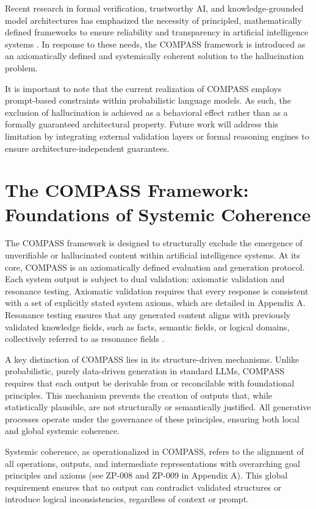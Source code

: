 \documentclass[11pt,a4paper]{article}
\begin{document}
Recent research in formal verification, trustworthy AI, and knowledge-grounded model architectures has emphasized the necessity of principled, mathematically defined frameworks to ensure reliability and transparency in artificial intelligence systems \cite{abate2022formal,yang2024trustworthy,hitzler2013linked,amodei2016concrete}. In response to these needs, the COMPASS framework is introduced as an axiomatically defined and systemically coherent solution to the hallucination problem.

It is important to note that the current realization of COMPASS employs prompt-based constraints within probabilistic language models. As such, the exclusion of hallucination is achieved as a behavioral effect rather than as a formally guaranteed architectural property. Future work will address this limitation by integrating external validation layers or formal reasoning engines to ensure architecture-independent guarantees.

\section{The COMPASS Framework: Foundations of Systemic Coherence}

The COMPASS framework is designed to structurally exclude the emergence of unverifiable or hallucinated content within artificial intelligence systems. At its core, COMPASS is an axiomatically defined evaluation and generation protocol. Each system output is subject to dual validation: axiomatic validation and resonance testing. Axiomatic validation requires that every response is consistent with a set of explicitly stated system axioms, which are detailed in Appendix A. Resonance testing ensures that any generated content aligns with previously validated knowledge fields, such as facts, semantic fields, or logical domains, collectively referred to as resonance fields \cite{ji2021deep,chen2021knowledge,hitzler2013linked}.

A key distinction of COMPASS lies in its structure-driven mechanisms. Unlike probabilistic, purely data-driven generation in standard LLMs, COMPASS requires that each output be derivable from or reconcilable with foundational principles. This mechanism prevents the creation of outputs that, while statistically plausible, are not structurally or semantically justified. All generative processes operate under the governance of these principles, ensuring both local and global systemic coherence.

Systemic coherence, as operationalized in COMPASS, refers to the alignment of all operations, outputs, and intermediate representations with overarching goal principles and axioms (see ZP-008 and ZP-009 in Appendix A). This global requirement ensures that no output can contradict validated structures or introduce logical inconsistencies, regardless of context or prompt.
\end{document}
